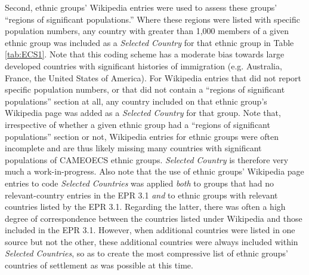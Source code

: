 \documentclass[12pt]{article}
\begin{document}
Second, ethnic groups' Wikipedia entries were used to assess these groups' ``regions of significant populations.''  Where these regions were listed with specific population numbers, any country with greater than 1,000 members of a given ethnic group was included as a \textit{Selected Country} for that ethnic group in Table \ref{tab:ECS1}.  Note that this coding scheme has a moderate bias towards large developed countries with significant histories of immigration (e.g. Australia, France, the United States of America).  For Wikipedia entries that did not report specific population numbers, or that did not contain a ``regions of significant populations'' section at all, any country included on that ethnic group's Wikipedia page was added as a \textit{Selected Country} for that group.  Note that, irrespective of whether a given ethnic group had a ``regions of significant populations'' section or not, Wikipedia entries for ethnic groups were often incomplete and are thus likely missing many countries with significant populations of CAMEOECS ethnic groups. \textit{Selected Country} is therefore very much a work-in-progress.  Also note that the use of ethnic groups' Wikipedia page entries to code \textit{Selected Countries} was applied \textit{both} to groups that had no relevant-country entries in the EPR 3.1 \textit{and} to ethnic groups with relevant countries listed by the EPR 3.1. Regarding the latter, there was often a high degree of correspondence between the countries listed under Wikipedia and those included in the EPR 3.1.  However, when additional countries were listed in one source but not the other, these additional countries were always included within \textit{Selected Countries}, so as to create the most compressive list of ethnic groups' countries of settlement as was possible at this time.
\end{document}
